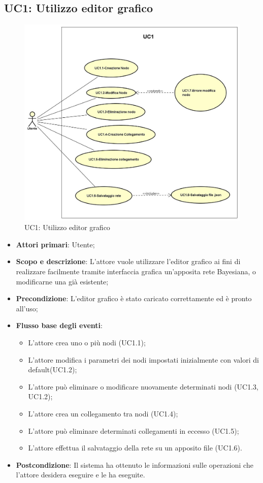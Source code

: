 \subsection{UC1: Utilizzo editor grafico}
\hypertarget{UC1}{} 
\begin{figure} [H]
	\centering
	\includegraphics[scale=0.45]{Img/UC1} 
	\caption{UC1: Utilizzo editor grafico} \label{} 
\end{figure} 
\begin{itemize} 
	\item{\textbf{Attori primari}: Utente;}
	\item{\textbf{Scopo e descrizione}: L'attore vuole utilizzare l'editor grafico ai fini di realizzare facilmente tramite interfaccia grafica un'apposita rete Bayesiana, o modificarne una già esistente;} 
	\item{\textbf{Precondizione}: L'editor grafico è stato caricato correttamente ed è pronto all'uso;} 
	\item{\textbf{Flusso base degli eventi}: 
		\begin{itemize} 
			\item{L'attore crea uno o più nodi (UC1.1);} 
			\item{L'attore modifica i parametri dei nodi impostati inizialmente con valori di default(UC1.2);} 
			\item{L'attore può eliminare o modificare nuovamente determinati nodi (UC1.3, UC1.2)}; 
			\item{L'attore crea un collegamento tra nodi (UC1.4);} 
			\item{L'attore può eliminare determinati collegamenti in eccesso (UC1.5);} 
			\item{L'attore effettua il salvataggio della rete su un apposito file (UC1.6).} 
		\end{itemize} 
	} 
	\item{\textbf{Postcondizione}: Il sistema ha ottenuto le informazioni sulle operazioni che l'attore desidera eseguire e le ha eseguite.} 
\end{itemize} 

